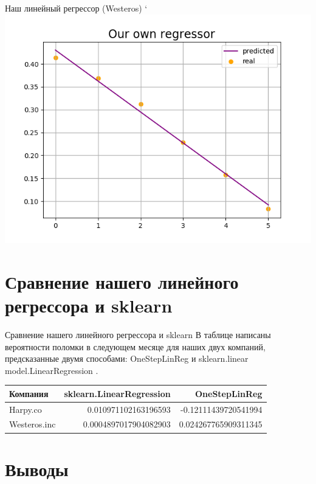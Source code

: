 \documentclass{beamer}
\begin{document}
\begin{frame}{Наш линейный регрессор (Westeros)}
`   \includegraphics[scale = 0.7]{Figure_5.png}
\end{frame}

\section{Сравнение нашего линейного регрессора и sklearn}

\begin{frame}{Сравнение нашего линейного регрессора и sklearn}
    В таблице написаны вероятности поломки в следующем месяце для наших двух компаний, предсказанные двумя способами: OneStepLinReg и sklearn.linear\underline{ }model.LinearRegression . 
    \begin{tabular}{l|r|r}
        Компания & sklearn.LinearRegression & OneStepLinReg\\\hline
        Harpy.co & 0.010971102163196593 & -0.12111439720541994 \\
        Westeros.inc & 0.0004897017904082903 & 0.024267765909311345
    \end{tabular}
    
\end{frame}

\section{Выводы}
\end{document}
